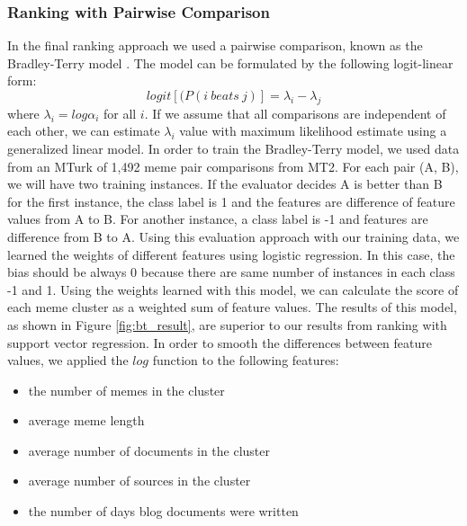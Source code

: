 \documentclass{sig-alternate}
\begin{document}
\subsubsection{Ranking with Pairwise Comparison}
In the final ranking approach we used a pairwise comparison, known as the Bradley-Terry model \cite{Bradley1952}. The model can be formulated by the following logit-linear form:
\begin{displaymath}
 logit[(P(i\ beats\ j)]=\lambda_i - \lambda_j
\end{displaymath}
where $\lambda_i=log\alpha_i$ for all $i$. If we assume that all comparisons are independent of each other, we can estimate $\lambda_i$ value with maximum likelihood estimate using a generalized linear model. In order to train the Bradley-Terry model, we used data from an MTurk of 1,492 meme pair comparisons from MT2. For each pair (A, B), we will have two training instances. If the evaluator decides A is better than B for the first instance, the class label is 1 and the features are difference of feature values from A to B. For another instance, a class label is -1 and features are difference from B to A. Using this evaluation approach with our training data, we learned the weights of different features using logistic regression. In this case, the bias should be always 0 because there are same number of instances in each class -1 and 1. Using the weights learned with this model, we can calculate the score of each meme cluster as a weighted sum of feature values. The results of this model, as shown in Figure \ref{fig:bt_result}, are superior to our results from ranking with support vector regression. In order to smooth the differences between feature values, we applied the $log$ function to the following features:
\begin{itemize}
 \item the number of memes in the cluster
 \item average meme length
 \item average number of documents in the cluster
 \item average number of sources in the cluster
 \item the number of days blog documents were written
\end{itemize}
\end{document}
